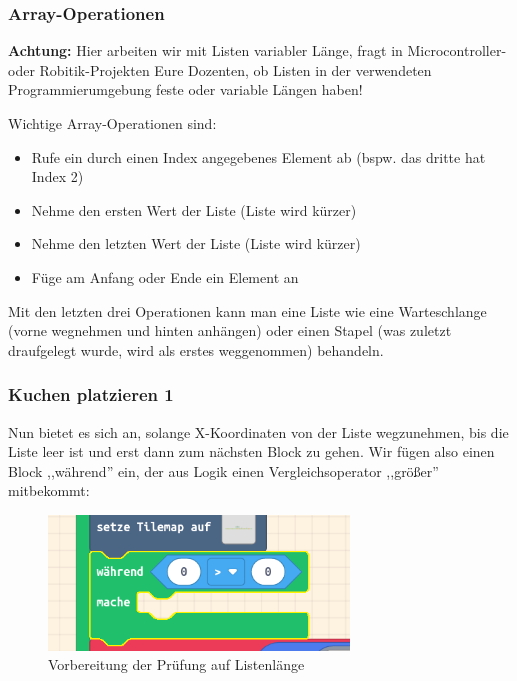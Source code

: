\documentclass{beamer}
\begin{document}
\begin{frame}
 \frametitle{Array-Operationen}
 
\textbf{Achtung:} Hier arbeiten wir mit Listen variabler Länge, fragt in Microcontroller- oder Robitik-Projekten Eure Dozenten, ob Listen in der verwendeten Programmierumgebung feste oder variable Längen haben!

Wichtige Array-Operationen sind:

\begin{itemize}
\item Rufe ein durch einen Index angegebenes Element ab (bspw. das dritte hat Index 2)
\item Nehme den ersten Wert der Liste (Liste wird kürzer)
\item Nehme den letzten Wert der Liste (Liste wird kürzer)
\item Füge am Anfang oder Ende ein Element an
\end{itemize}
 
Mit den letzten drei Operationen kann man eine Liste wie eine Warteschlange (vorne wegnehmen und hinten anhängen) oder einen Stapel (was zuletzt draufgelegt wurde, wird als erstes weggenommen) behandeln.
 
\end{frame}

\begin{frame}
 \frametitle{Kuchen platzieren 1}
 
Nun bietet es sich an, solange X-Koordinaten von der Liste wegzunehmen, bis die Liste leer ist und erst dann zum nächsten Block zu gehen. Wir fügen also einen Block ,,während'' ein, der aus Logik einen Vergleichsoperator ,,größer'' mitbekommt:

\begin{figure}
  \includegraphics[width=8cm]{game42.png}
  \caption{Vorbereitung der Prüfung auf Listenlänge}
  \label{fig:game42}
\end{figure}

\end{frame}
\end{document}

